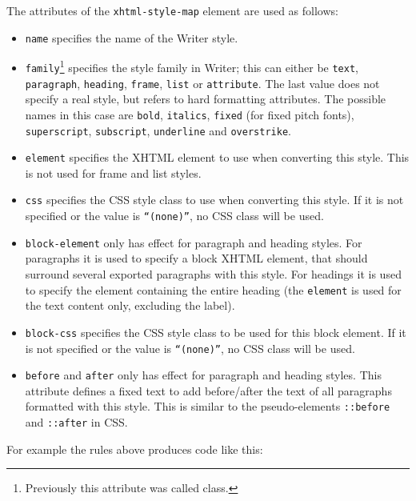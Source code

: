 \documentclass{article}
\newcommand\textstyleSourceText[1]{\texttt{\textmd{#1}}}
\newcommand\textstylesourcefootnote[1]{\texttt{\textmd{#1}}}
\newcommand\liststyleLxiii{%
\renewcommand\labelitemi{${\bullet}$}
\renewcommand\labelitemii{${\circ}$}
\renewcommand\labelitemiii{${\blacksquare}$}
\renewcommand\labelitemiv{${\bullet}$}
}
\begin{document}
{\mdseries
The attributes of the \textstyleSourceText{xhtml-style-map} element are used as follows:}

\liststyleLxiii
\begin{itemize}
\item \textstyleSourceText{name} specifies the name of the Writer style.
\item \textstyleSourceText{family}\footnote{Previously this attribute was called class.} specifies the style family in Writer; this can either be \textstyleSourceText{text}, \textstyleSourceText{paragraph}, \textstyleSourceText{heading}, \textstyleSourceText{frame}, \textstyleSourceText{list} or \textstyleSourceText{attribute}. The last value does not specify a real style, but refers to hard formatting attributes. The possible names in this case are \textstyleSourceText{bold}, \textstyleSourceText{italics}, \textstyleSourceText{fixed} (for fixed pitch fonts), \textstyleSourceText{superscript}, \textstyleSourceText{subscript}, \textstylesourcefootnote{underline} and \textstyleSourceText{overstrike}.
\item \textstyleSourceText{element} specifies the XHTML element to use when converting this style. This is not used for frame and list styles.
\item \textstyleSourceText{css} specifies the CSS style class to use when converting this style. If it is not specified or the value is \textstyleSourceText{``(none)''}, no CSS class will be used.
\item \textstyleSourceText{block-element} only has effect for paragraph and heading styles. For paragraphs it is used to specify a block XHTML element, that should surround several exported paragraphs with this style. For headings it is used to specify the element containing the entire heading (the \textstyleSourceText{element} is used for the text content only, excluding the label).
\item \textstyleSourceText{block-css} specifies the CSS style class to be used for this block element. If it is not specified or the value is \textstyleSourceText{``(none)''}, no CSS class will be used.
\item \textstyleSourceText{before} and \textstyleSourceText{after} only has effect for paragraph and heading styles. This attribute defines a fixed text to add before/after the text of all paragraphs formatted with this style. This is similar to the pseudo-elements \textstyleSourceText{::before} and \textstyleSourceText{::after} in CSS.
\end{itemize}
{\mdseries
For example the rules above produces code like this:}
\end{document}
